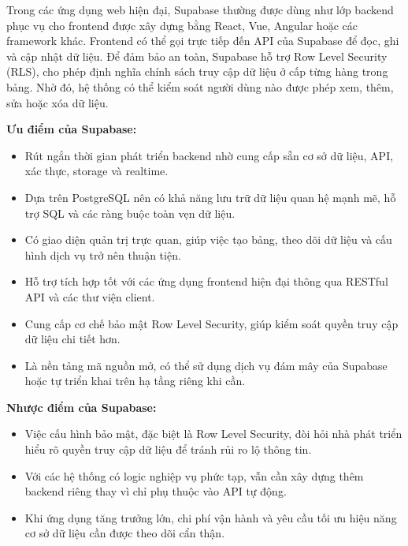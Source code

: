 Trong các ứng dụng web hiện đại, Supabase thường được dùng như lớp backend phục vụ cho frontend được xây dựng bằng React, Vue, Angular hoặc các framework khác. Frontend có thể gọi trực tiếp đến API của Supabase để đọc, ghi và cập nhật dữ liệu. Để đảm bảo an toàn, Supabase hỗ trợ Row Level Security (RLS), cho phép định nghĩa chính sách truy cập dữ liệu ở cấp từng hàng trong bảng. Nhờ đó, hệ thống có thể kiểm soát người dùng nào được phép xem, thêm, sửa hoặc xóa dữ liệu.

\textbf{Ưu điểm của Supabase:}
\begin{itemize}
    \item Rút ngắn thời gian phát triển backend nhờ cung cấp sẵn cơ sở dữ liệu, API, xác thực, storage và realtime.
    \item Dựa trên PostgreSQL nên có khả năng lưu trữ dữ liệu quan hệ mạnh mẽ, hỗ trợ SQL và các ràng buộc toàn vẹn dữ liệu.
    \item Có giao diện quản trị trực quan, giúp việc tạo bảng, theo dõi dữ liệu và cấu hình dịch vụ trở nên thuận tiện.
    \item Hỗ trợ tích hợp tốt với các ứng dụng frontend hiện đại thông qua RESTful API và các thư viện client.
    \item Cung cấp cơ chế bảo mật Row Level Security, giúp kiểm soát quyền truy cập dữ liệu chi tiết hơn.
    \item Là nền tảng mã nguồn mở, có thể sử dụng dịch vụ đám mây của Supabase hoặc tự triển khai trên hạ tầng riêng khi cần.
\end{itemize}

\textbf{Nhược điểm của Supabase:}
\begin{itemize}
    \item Việc cấu hình bảo mật, đặc biệt là Row Level Security, đòi hỏi nhà phát triển hiểu rõ quyền truy cập dữ liệu để tránh rủi ro lộ thông tin.
    \item Với các hệ thống có logic nghiệp vụ phức tạp, vẫn cần xây dựng thêm backend riêng thay vì chỉ phụ thuộc vào API tự động.
    \item Khi ứng dụng tăng trưởng lớn, chi phí vận hành và yêu cầu tối ưu hiệu năng cơ sở dữ liệu cần được theo dõi cẩn thận.
\end{itemize}
